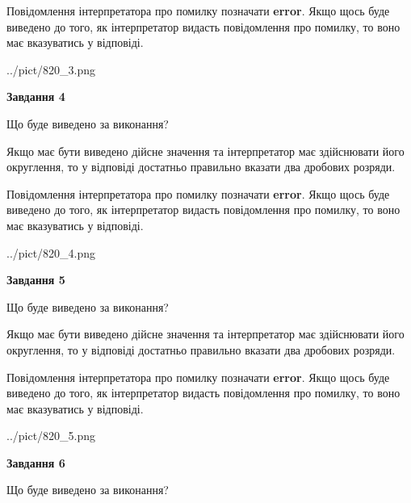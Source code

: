 \documentclass[12pt, ukrainian]{article}
\begin{document}
{\begin {Large}
Повідомлення інтерпретатора про помилку позначати \textbf{error}.
Якщо щось буде виведено до того, як інтерпретатор видасть повідомлення про помилку, 
то воно має вказуватись у відповіді. \par

\begin{center}
	{../pict/820_3.png}
\end{center}
\newpage

{\begin {center}\textbf{Завдання 4}\end {center}}\par
Що буде виведено за виконання? \par

Якщо має бути виведено дійсне значення та інтерпретатор має здійснювати його округлення, 
то у відповіді достатньо правильно вказати два дробових розряди.

Повідомлення інтерпретатора про помилку позначати \textbf{error}.
Якщо щось буде виведено до того, як інтерпретатор видасть повідомлення про помилку, 
то воно має вказуватись у відповіді. \par

\begin{center}
	{../pict/820_4.png}
\end{center}
\newpage

{\begin {center}\textbf{Завдання 5}\end {center}}\par
Що буде виведено за виконання? \par

Якщо має бути виведено дійсне значення та інтерпретатор має здійснювати його округлення, 
то у відповіді достатньо правильно вказати два дробових розряди.

Повідомлення інтерпретатора про помилку позначати \textbf{error}.
Якщо щось буде виведено до того, як інтерпретатор видасть повідомлення про помилку, 
то воно має вказуватись у відповіді. \par

\begin{center}
	{../pict/820_5.png}
\end{center}
\newpage

{\begin {center}\textbf{Завдання 6}\end {center}}\par
Що буде виведено за виконання? \par


\end{Large}}
\end{document}
